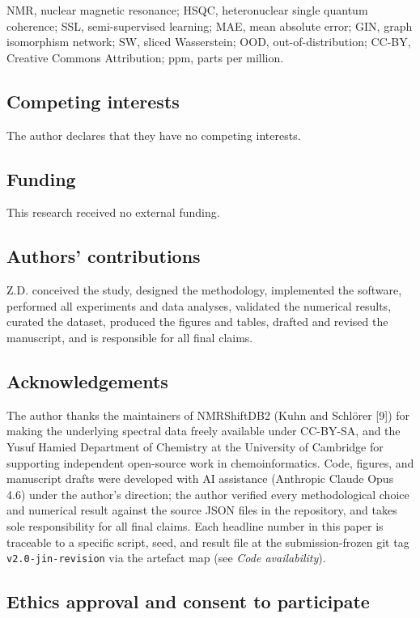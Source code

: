 \documentclass[
  11pt,
  a4paper,
]{article}
\begin{document}
NMR, nuclear magnetic resonance; HSQC, heteronuclear single quantum
coherence; SSL, semi-supervised learning; MAE, mean absolute error;
GIN, graph isomorphism network; SW, sliced Wasserstein; OOD,
out-of-distribution; CC-BY, Creative Commons Attribution; ppm, parts
per million.

\subsection*{Competing interests}

The author declares that they have no competing interests.

\subsection*{Funding}

This research received no external funding.

\subsection*{Authors' contributions}

Z.D. conceived the study, designed the methodology, implemented the
software, performed all experiments and data analyses, validated the
numerical results, curated the dataset, produced the figures and
tables, drafted and revised the manuscript, and is responsible for all
final claims.

\subsection*{Acknowledgements}

The author thanks the maintainers of NMRShiftDB2 (Kuhn and Schlörer
{[}9{]}) for making the underlying spectral data freely available under
CC-BY-SA, and the Yusuf Hamied Department of Chemistry at the
University of Cambridge for supporting independent open-source work
in chemoinformatics. Code, figures, and manuscript drafts were
developed with AI assistance (Anthropic Claude Opus 4.6) under the
author's direction; the author verified every methodological
choice and numerical result against the source JSON files in the
repository, and takes sole responsibility for all final claims.
Each headline number in this paper is traceable to a specific
script, seed, and result file at the submission-frozen git tag
\texttt{v2.0-jin-revision} via the artefact map (see \emph{Code availability}).

\subsection*{Ethics approval and consent to participate}
\end{document}

